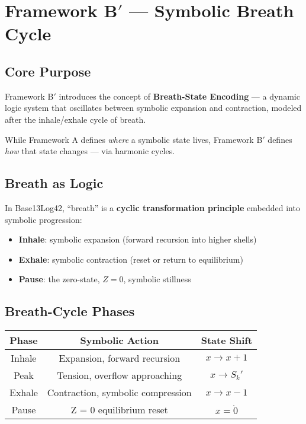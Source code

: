 \usepackage{amsmath}
\usepackage{amssymb}
\usepackage{graphicx}
\usepackage{array}

\section*{Framework B$'$ — Symbolic Breath Cycle}

\subsection*{Core Purpose}

Framework B$'$ introduces the concept of \textbf{Breath-State Encoding} — a dynamic logic system that oscillates between symbolic expansion and contraction, modeled after the inhale/exhale cycle of breath.

While Framework A defines \emph{where} a symbolic state lives, Framework B$'$ defines \emph{how} that state changes — via harmonic cycles.

\subsection*{Breath as Logic}

In Base13Log42, ``breath'' is a \textbf{cyclic transformation principle} embedded into symbolic progression:
\begin{itemize}
  \item \textbf{Inhale}: symbolic expansion (forward recursion into higher shells)
  \item \textbf{Exhale}: symbolic contraction (reset or return to equilibrium)
  \item \textbf{Pause}: the zero-state, $Z = 0$, symbolic stillness
\end{itemize}

\subsection*{Breath-Cycle Phases}

\begin{center}
\begin{tabular}{|c|c|c|}
\hline
\textbf{Phase} & \textbf{Symbolic Action} & \textbf{State Shift} \\
\hline
Inhale & Expansion, forward recursion & $x \rightarrow x + 1$ \\
Peak   & Tension, overflow approaching & $x \rightarrow S_k'$ \\
Exhale & Contraction, symbolic compression & $x \rightarrow x - 1$ \\
Pause  & Z = 0 equilibrium reset & $x = \dot{0}$ \\
\hline
\end{tabular}
\end{center}


